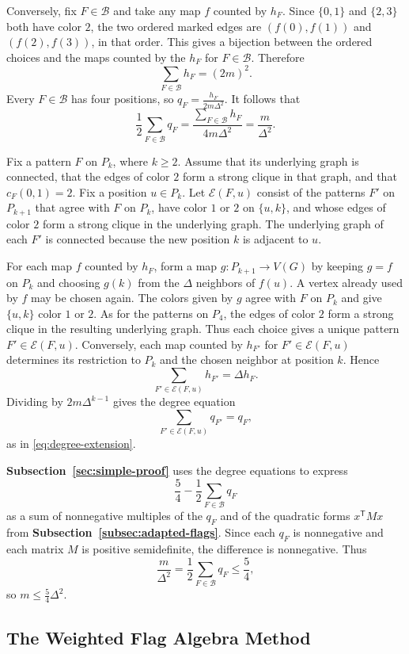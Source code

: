 \documentclass[preprint,11pt,numbers]{elsarticle-arxiv}
\numberwithin{equation}{section}
\theoremstyle{definition}
\begin{document}
Conversely, fix $F\in\mathcal B$ and take any map $f$ counted by
$h_F$. Since $\{0,1\}$ and $\{2,3\}$ both have color $2$, the two
ordered marked edges are $(f(0),f(1))$ and $(f(2),f(3))$, in that
order. This gives a bijection between the ordered choices and the
maps counted by the $h_F$ for $F\in\mathcal B$. Therefore
\[
 \sum_{F\in\mathcal B}h_F=(2m)^2.
\]
Every $F\in\mathcal B$ has four positions, so
$q_F=\frac{h_F}{2m\Delta^2}$. It follows that
\[
 \frac{1}{2}\sum_{F\in\mathcal B}q_F
 =\frac{\displaystyle\sum_{F\in\mathcal B}h_F}{4m\Delta^2}
 =\frac{m}{\Delta^2}.
\]

Fix a pattern $F$ on $P_k$, where $k\geq 2$. Assume that its
underlying graph is connected, that the edges of color $2$ form a
strong clique in that graph, and that $c_F(0,1)=2$. Fix a position
$u\in P_k$. Let $\mathcal E(F,u)$ consist of the patterns $F'$
on $P_{k+1}$ that agree with $F$ on $P_k$, have color $1$ or $2$
on $\{u,k\}$, and whose edges of color $2$ form a strong clique
in the underlying graph. The underlying graph of each $F'$ is
connected because the new position $k$ is adjacent to $u$.

For each map $f$ counted by $h_F$, form a map
$g\colon P_{k+1}\to V(G)$ by keeping $g=f$ on $P_k$ and choosing
$g(k)$ from the $\Delta$ neighbors of $f(u)$. A vertex already used
by $f$ may be chosen again. The colors given by $g$ agree with $F$
on $P_k$ and give $\{u,k\}$ color $1$ or $2$. As for the patterns
on $P_4$, the edges of color $2$ form a strong clique in the
resulting underlying graph. Thus each choice gives a unique
pattern $F'\in\mathcal E(F,u)$. Conversely, each map counted by
$h_{F'}$ for $F'\in\mathcal E(F,u)$ determines its restriction to
$P_k$ and the chosen neighbor at position $k$. Hence
\[
 \sum_{F'\in\mathcal E(F,u)}h_{F'}=\Delta h_F.
\]
Dividing by $2m\Delta^{k-1}$ gives the degree equation
\[
 \sum_{F'\in\mathcal E(F,u)}q_{F'}=q_F,
\]
as in \eqref{eq:degree-extension}.

\textbf{Subsection~\ref{sec:simple-proof}} uses the degree equations
to express
\[
 \frac{5}{4}-\frac{1}{2}\sum_{F\in\mathcal B}q_F
\]
as a sum of nonnegative multiples of the $q_F$ and of the quadratic
forms $x^{\mathsf T}Mx$ from
\textbf{Subsection~\ref{subsec:adapted-flags}}. Since each $q_F$ is
nonnegative and each matrix $M$ is positive semidefinite, the
difference is nonnegative. Thus
\[
 \frac{m}{\Delta^2}=\frac{1}{2}\sum_{F\in\mathcal B}q_F
 \leq\frac{5}{4},
\]
so $m\leq\frac{5}{4}\Delta^2$.

\subsection{The Weighted Flag Algebra Method}\label{subsec:weighted-sketch}
\end{document}
